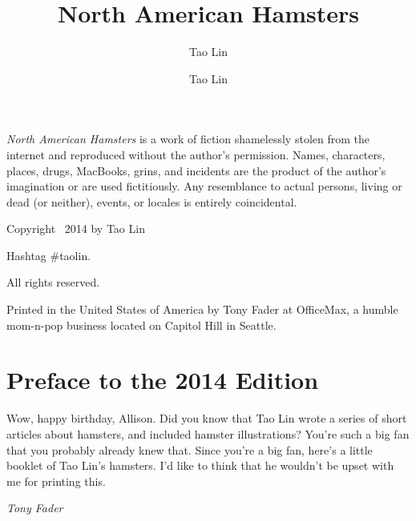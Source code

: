 \documentclass[10pt,twoside,openright]{memoir}
\author{Tao Lin}
\author{Tao Lin}
\title{North American Hamsters}
\date{}
\makeatletter
\def\maketitle{%
  \null
  \thispagestyle{empty}%
  \vfill
  \begin{center}\leavevmode
    \normalfont
    {\LARGE\raggedleft \@author\par}%
    \hrulefill\par
    {\huge\raggedright \@title\par}%
    \vskip 1cm
  \end{center}%
  \vfill
  \null
  \cleardoublepage
  }
\makeatother
\begin{document}
\OnehalfSpacing


\let\cleardoublepage\clearpage


\maketitle






\frontmatter


\null\vfill

\begin{flushleft}
\scriptsize
{\em North American Hamsters} is a work of fiction shamelessly stolen from the
internet and reproduced without the author's permission. Names, characters,
places, drugs, MacBooks, grins, and incidents are the product of the author's
imagination or are used fictitiously. Any resemblance to actual persons, 
living or dead (or neither), events, or locales is entirely coincidental. 

\bigskip

Copyright \textcopyright\ 2014 by Tao Lin
\bigskip

Hashtag \#taolin.
\bigskip

All rights reserved. 
\bigskip

Printed in the United States of America by Tony Fader at OfficeMax, a humble
mom-n-pop business located on Capitol Hill in Seattle. 


\end{flushleft}
\let\cleardoublepage\clearpage

\mainmatter
\sloppy

\renewcommand\cftchapteraftersnumb{\normalfont\tiny}
\tableofcontents*




\chapter*{Preface to the 2014 Edition}
Wow, happy birthday, Allison. Did you know that Tao Lin wrote a series of 
short articles about hamsters, and included hamster illustrations? You're such a
big fan that you probably already knew that. Since you're a big fan, here's a
little booklet of Tao Lin's hamsters. I'd like to think that he wouldn't be 
upset with me for printing this.

\vspace{2em}
\hspace{7em} {\em Tony Fader} 
\end{document}
